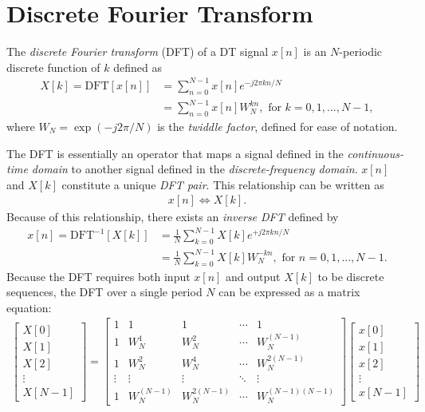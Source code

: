 \documentclass{report}
\begin{document}
\section{Discrete Fourier Transform}
\begin{tcolorbox}[width=\textwidth,colback={white}, sharp corners]
    The \emph{discrete Fourier transform} (DFT) of a DT signal $x[n]$ is an $N$-periodic discrete function of $k$ defined as 
    \begin{align}
        X[k] = \text{DFT}[x[n]] &= \sum_{n=0}^{N-1} x[n] e^{-j2\pi kn/N} \\
        &= \sum_{n=0}^{N-1} x[n] W^{kn}_N, \text{ for } k=0,1,...,N-1,
    \end{align}
    where $W_N=\exp(-j2\pi/N)$ is the \emph{twiddle factor}, defined for ease of notation.
\end{tcolorbox}
The DFT is essentially an operator that maps a signal defined in the \emph{continuous-time domain} to another signal defined 
in the \emph{discrete-frequency domain}. $x[n]$ and $X[k]$ constitute a unique \emph{DFT pair}. This relationship can be written as 
\begin{align}
    x[n] \iff X[k].
\end{align}
Because of this relationship, there exists an \emph{inverse DFT} defined by
\begin{align}
    x[n] = \text{DFT}^{-1}[X[k]] &= \frac{1}{N}\sum_{k=0}^{N-1} X[k] e^{+j2\pi kn/N} \\
    &= \frac{1}{N}\sum_{k=0}^{N-1} X[k] W^{-kn}_N, \text{ for } n=0,1,...,N-1.
\end{align}
Because the DFT requires both input $x[n]$ and output $X[k]$ to be discrete sequences, the DFT over a single period $N$ can be expressed as a matrix equation:
\begin{align}
    \begin{bmatrix}
        X[0] \\
        X[1] \\
        X[2] \\
        \vdots \\
        X[N-1]
    \end{bmatrix} = 
    \begin{bmatrix}
        1 & 1 & 1 & \cdots & 1 \\
        1 & W_N^1 & W_N^2 & \cdots & W_N^{(N-1)} \\
        1 & W_N^2 & W_N^4 & \cdots & W_N^{2(N-1)} \\
        \vdots & \vdots & \vdots & \ddots & \vdots \\
        1 & W_N^{(N-1)} & W_N^{2(N-1)} & \cdots & W_N^{(N-1)(N-1)}
    \end{bmatrix}
    \begin{bmatrix}
        x[0] \\
        x[1] \\
        x[2] \\
        \vdots \\
        x[N-1]
    \end{bmatrix}
\end{align}
\end{document}
